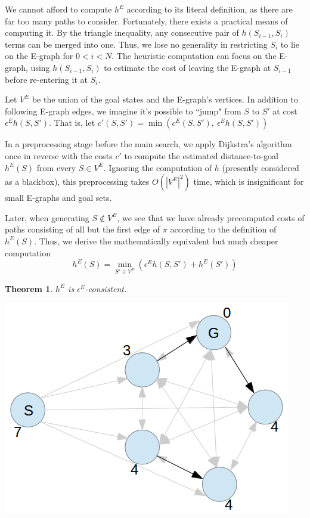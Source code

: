 \documentclass[letterpaper]{article}
\newtheorem{thm}{Theorem}
\begin{document}
We cannot afford to compute $h^E$ according to its literal definition, as there are far too many paths to consider.
Fortunately, there exists a practical means of computing it. By the triangle inequality, any consecutive pair of $h(S_{i-1},S_i)$ terms can be merged into one.
Thus, we lose no generality in restricting $S_i$ to lie on the E-graph for $0 < i < N$.
The heuristic computation can focus on the E-graph, using $h(S_{i-1},S_i)$ to estimate the cost of leaving the E-graph at $S_{i-1}$ before re-entering it at $S_i$.

Let $V^E$ be the union of the goal states and the E-graph's vertices.
In addition to following E-graph edges, we imagine it's possible to ``jump" from $S$ to $S'$ at cost $\epsilon^E h(S,S')$.
That is, let $c'(S,S') = \min\left(c^E(S,S'),~\epsilon^E h(S,S')\right)$


In a preprocessing stage before the main search, we apply Dijkstra's algorithm once in reverse with the costs $c'$ to compute the estimated distance-to-goal $h^E(S)$ from every $S\in V^E$. Ignoring the computation of $h$ (presently considered as a blackbox), this preprocessing takes $O(|V^E|^2)$ time, which is insignificant for small E-graphs and goal sets.

Later, when generating $S \notin V^E$, we see that we have already precomputed costs of paths consisting of all but the first edge of $\pi$ according to the definition of $h^E(S)$. Thus, we derive the mathematically equivalent but much cheaper computation
\[h^E(S) = \min_{S'\in V^E} \left(\epsilon^E h(S,S') + h^E(S')\right)\]

\begin{thm}$h^E$ is $\epsilon^E$-consistent. \cite{phillips2012graphs}\end{thm}

\includegraphics[scale=0.4]{Pentagon.png}
\end{document}
